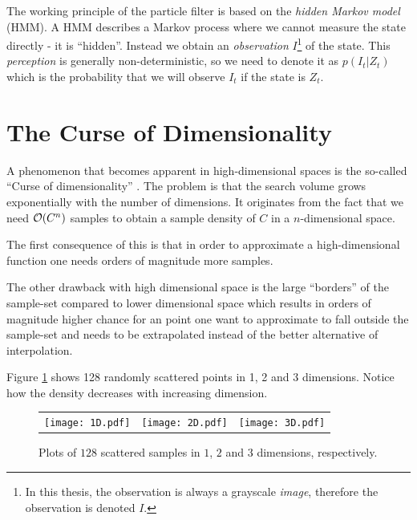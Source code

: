 The working principle of the particle filter is based on the \emph{hidden Markov model} (HMM).
A HMM describes a Markov process where we cannot measure the state directly - it is ``hidden''\cite{EncyclopediaMachineLearning}.
Instead we obtain an \emph{observation} $I$\footnote{In this thesis, the observation is always a grayscale \emph{image}, 
therefore the observation is denoted $I$.}  of the state. This \emph{perception} is generally non-deterministic, 
so we need to denote it as $p(I_t|Z_t)$ which is the probability that we will observe $I_t$ if the state is $Z_t$.

\section{The Curse of Dimensionality}
A phenomenon that becomes apparent in high-dimensional spaces is the so-called ``Curse of dimensionality'' \cite{EncyclopediaMachineLearning}.
The problem is that the search volume grows exponentially with the number of dimensions. 
It originates from the fact that we need $\mathcal{O}{\left(C^n\right)}$ samples to obtain a sample density of $C$ in a $n$-dimensional space.

The first consequence of this is that in order to approximate a high-dimensional function one needs orders of magnitude more samples.

The other drawback with high dimensional space is the large ``borders'' 
of the sample-set compared to lower dimensional space which results in orders of
magnitude higher chance for an point one want to approximate to fall outside
the sample-set and needs to be extrapolated instead of the better alternative of interpolation.


\begin{example}
  Figure \ref{fig:curse-of-dimensionality} shows 128 randomly scattered points in 1, 2 and 3 dimensions. Notice how the density decreases with increasing dimension.
  \begin{figure}
    \begin{tabular}{rcl}
      \texttt{[image: 1D.pdf]}&
      \texttt{[image: 2D.pdf]}&
      \texttt{[image: 3D.pdf]}
    \end{tabular}
    \caption{Plots of $128$ scattered samples in $1$, $2$ and $3$ dimensions, respectively.}
    \label{fig:curse-of-dimensionality}
  \end{figure}
\end{example}

